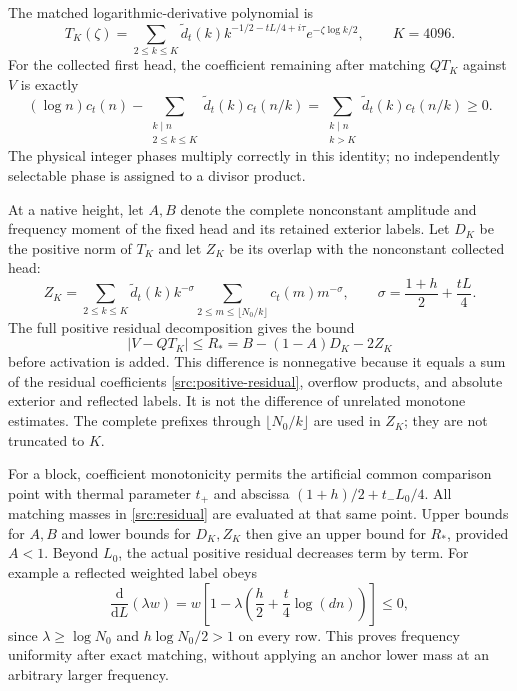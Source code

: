 \documentclass[11pt,a4paper]{article}
\theoremstyle{definition}
\theoremstyle{remark}
\newcommand{\dd}{\mathrm d}
\begin{document}
The matched logarithmic-derivative polynomial is
\[
 T_K(\zeta)=\sum_{2\leq k\leq K}\widetilde d_t(k)
 k^{-1/2-tL/4+i\tau}e^{-\zeta\log k/2},\qquad K=4096.
\]
For the collected first head, the coefficient remaining after matching
$QT_K$ against $V$ is exactly
\begin{equation}
 (\log n)c_t(n)
 -\sum_{\substack{k\mid n\\2\leq k\leq K}}
           \widetilde d_t(k)c_t(n/k)
 =\sum_{\substack{k\mid n\\k>K}}
           \widetilde d_t(k)c_t(n/k)\geq0.
 \label{src:positive-residual}
\end{equation}
The physical integer phases multiply correctly in this identity; no
independently selectable phase is assigned to a divisor product.

At a native height, let $A,B$ denote the complete nonconstant amplitude
and frequency moment of the fixed head and its retained exterior labels.
Let $D_K$ be the positive norm of $T_K$ and let $Z_K$ be its overlap
with the nonconstant collected head:
\[
 Z_K=\sum_{2\leq k\leq K}\widetilde d_t(k)k^{-\sigma}
       \sum_{2\leq m\leq\lfloor N_0/k\rfloor}c_t(m)m^{-\sigma},
 \qquad \sigma=\frac{1+h}{2}+\frac{tL}{4}.
\]
The full positive residual decomposition gives the bound
\begin{equation}
 |V-QT_K|\leq R_*=B-(1-A)D_K-2Z_K
 \label{src:residual}
\end{equation}
before activation is added.  This difference is nonnegative because it
equals a sum of the residual coefficients
\eqref{src:positive-residual}, overflow products, and absolute exterior
and reflected labels.  It is not the difference of unrelated monotone
estimates.  The complete prefixes through $\lfloor N_0/k\rfloor$ are
used in $Z_K$; they are not truncated to $K$.

For a block, coefficient monotonicity permits the artificial common
comparison point with thermal parameter $t_+$ and abscissa
$(1+h)/2+t_-L_0/4$.  All matching masses in
\eqref{src:residual} are evaluated at that same point.  Upper bounds for
$A,B$ and lower bounds for $D_K,Z_K$ then give an upper bound for
$R_*$, provided $A<1$.  Beyond $L_0$, the actual positive residual
decreases term by term.  For example a reflected weighted label obeys
\[
 \frac{\dd}{\dd L}(\lambda w)
 =w\left[1-\lambda\left(\frac h2+\frac t4\log(dn)\right)\right]
 \leq0,
\]
since $\lambda\geq\log N_0$ and $h\log N_0/2>1$ on every row.
This proves frequency uniformity after exact matching, without applying
an anchor lower mass at an arbitrary larger frequency.
\end{document}
